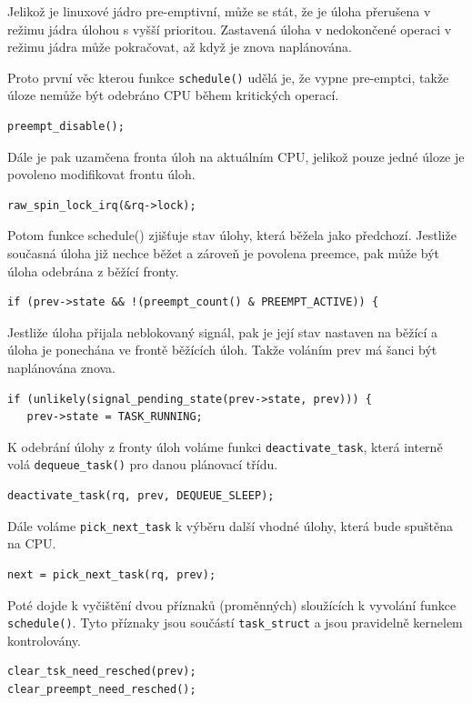 \documentclass[a4paper,12pt]{article}
\begin{document}
Jelikož je linuxové jádro pre-emptivní, může se stát, že je úloha přerušena v režimu jádra úlohou s vyšší prioritou. Zastavená úloha v nedokončené operaci v režimu jádra může pokračovat, až když je znova naplánována. 

Proto první věc kterou funkce \verb#schedule()# udělá je, že vypne pre-emptci, takže úloze nemůže být odebráno CPU během kritických operací. 
\begin{verbatim}
preempt_disable();
\end{verbatim}
Dále je pak uzamčena fronta úloh na aktuálním CPU, jelikož pouze jedné úloze je povoleno modifikovat frontu úloh.
\begin{verbatim}
raw_spin_lock_irq(&rq->lock);
\end{verbatim}
Potom funkce schedule() zjišťuje stav úlohy, která běžela jako předchozí. Jestliže současná úloha již nechce běžet a zároveň je povolena preemce, pak může být úloha odebrána z běžící fronty. 
\begin{verbatim}
if (prev->state && !(preempt_count() & PREEMPT_ACTIVE)) {
\end{verbatim}
Jestliže úloha přijala neblokovaný signál, pak je její stav nastaven na běžící a úloha je ponechána ve frontě běžících úloh. Takže voláním prev má šanci být naplánována znova. 
\begin{verbatim}
if (unlikely(signal_pending_state(prev->state, prev))) {
   prev->state = TASK_RUNNING;
\end{verbatim}
K odebrání úlohy z fronty úloh voláme funkci \verb#deactivate_task#, která interně volá \verb#dequeue_task()# pro danou plánovací třídu.
\begin{verbatim}
deactivate_task(rq, prev, DEQUEUE_SLEEP);
\end{verbatim}
Dále voláme \verb#pick_next_task# k výběru další vhodné úlohy, která bude spuštěna na CPU. 
\begin{verbatim}
next = pick_next_task(rq, prev);
\end{verbatim}
Poté dojde k vyčištění dvou příznaků (proměnných) sloužících k vyvolání funkce \verb#schedule()#. Tyto příznaky jsou součástí \verb#task_struct# a jsou pravidelně kernelem kontrolovány. 
\begin{verbatim}
clear_tsk_need_resched(prev);
clear_preempt_need_resched();
\end{verbatim}
%
\end{document}
